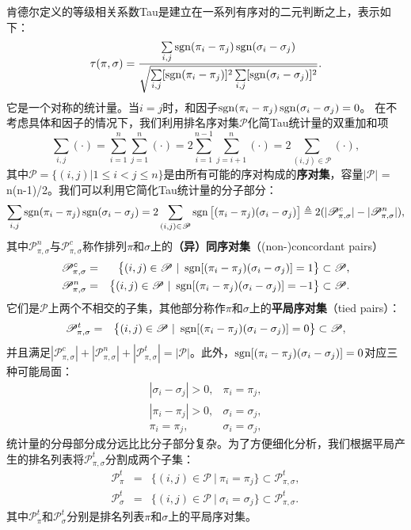 肯德尔定义的等级相关系数Tau是建立在一系列有序对的二元判断之上，表示如下：
\begin{equation}
    \tau(\pi,\sigma) = \frac{\sum\limits_{i,j} \operatorname{\mathrm{sgn}}(\pi_i - \pi_j) \operatorname{\mathrm{sgn}}(\sigma_i - \sigma_j)}{\sqrt{\sum\limits_{i,j} [\operatorname{\mathrm{sgn}}(\pi_i - \pi_j)]^2 \sum\limits_{i,j} [\operatorname{\mathrm{sgn}}(\sigma_i - \sigma_j)]^2}}.
\end{equation}
它是一个对称的统计量。当$i=j$时，和因子$\operatorname{\mathrm{sgn}}(\pi_i - \pi_j)\operatorname{\mathrm{sgn}}(\sigma_i - \sigma_j)= 0$。
在不考虑具体和因子的情况下，我们利用排名序对集$\mathscr P$化简Tau统计量的双重加和项
\[
    \sum\limits_{i,j} (\cdot) = \sum\limits_{i=1}^n \sum\limits_{j=1}^n (\cdot) = 2 \sum\limits_{i=1}^{n-1} \sum\limits_{j = i + 1}^n (\cdot)
    = 2 \sum\limits_{(i,j)\in \mathscr P}(\cdot),
\]
其中$\mathscr P = \big\{(i,j)|1\le i < j \le n\big\}$是由所有可能的序对构成的\textbf{序对集}，容量$|\mathscr P|$ = n(n-1)/2。我们可以利用它简化Tau统计量的分子部分：
\[
    \sum\limits_{i,j} \operatorname{\mathrm{sgn}}(\pi_i - \pi_j) \operatorname{\mathrm{sgn}}(\sigma_i - \sigma_j)
     = 2\sum\limits_{(i,j)\in \mathscr P} \operatorname{\mathrm{sgn}}\big[(\pi_i - \pi_j)(\sigma_i - \sigma_j)\big]
     \triangleq 2(|\mathscr P_{\pi,\sigma}^c| - |\mathscr P_{\pi,\sigma}^n|),
\]
其中$\mathscr P_{\pi,\sigma}^n$与$\mathscr P_{\pi,\sigma}^c$称作排列$\pi$和$\sigma$上的\textbf{（异）同序对集}（(non-)concordant pairs）
\begin{eqnarray}
      \mathscr P_{\pi,\sigma}^c & = & \big\{(i,j)\in \mathscr P~|~\operatorname{\mathrm{sgn}}[(\pi_i - \pi_j)(\sigma_i - \sigma_j)] = 1\big\}\subset \mathscr P, \\
      \mathscr P_{\pi,\sigma}^n & = & \big\{(i,j)\in \mathscr P~|~\operatorname{\mathrm{sgn}}[(\pi_i - \pi_j)(\sigma_i - \sigma_j)] = -1\big\}\subset \mathscr P.
\end{eqnarray}
它们是$\mathscr P$上两个不相交的子集，其他部分称作$\pi$和$\sigma$上的\textbf{平局序对集}（tied pairs）：
\begin{eqnarray}
    \mathscr P_{\pi,\sigma}^t  & = &  \big\{(i,j)\in \mathscr P~|~\operatorname{\mathrm{sgn}}[(\pi_i - \pi_j)(\sigma_i - \sigma_j)] = 0\big\}\subset \mathscr P,
\end{eqnarray}
并且满足$|\mathscr P_{\pi,\sigma}^c| + |\mathscr P_{\pi,\sigma}^n| + |\mathscr P_{\pi,\sigma}^t| = |\mathscr P|$。此外，$\operatorname{\mathrm{sgn}}[(\pi_i - \pi_j)(\sigma_i - \sigma_j)] = 0$对应三种可能局面：
\begin{eqnarray}
  |\sigma_i - \sigma_j| > 0, & \pi_i = \pi_j, \label{eq:tie-1}\\
  |\pi_i - \pi_j| > 0,& \sigma_i = \sigma_j, \label{eq:tie-2}\\
  \pi_i = \pi_j,& \sigma_i = \sigma_j, \label{eq:tie-3}
\end{eqnarray}
统计量的分母部分成分远比比分子部分复杂。为了方便细化分析，我们根据平局产生的排名列表将$\mathscr P_{\pi,\sigma}^t$分割成两个子集：
\begin{eqnarray}
  \mathscr P^t_\pi &=& \big\{(i,j)\in \mathscr P~|~\pi_i = \pi_j\big\}\subset \mathscr P_{\pi,\sigma}^t, \\
  \mathscr P^t_\sigma &=& \big\{(i,j)\in \mathscr P~|~\sigma_i = \sigma_j\big\}\subset \mathscr P_{\pi,\sigma}^t.
\end{eqnarray}
其中$\mathscr P_\pi^t$和$\mathscr P_\sigma^t$分别是排名列表$\pi$和$\sigma$上的平局序对集。

